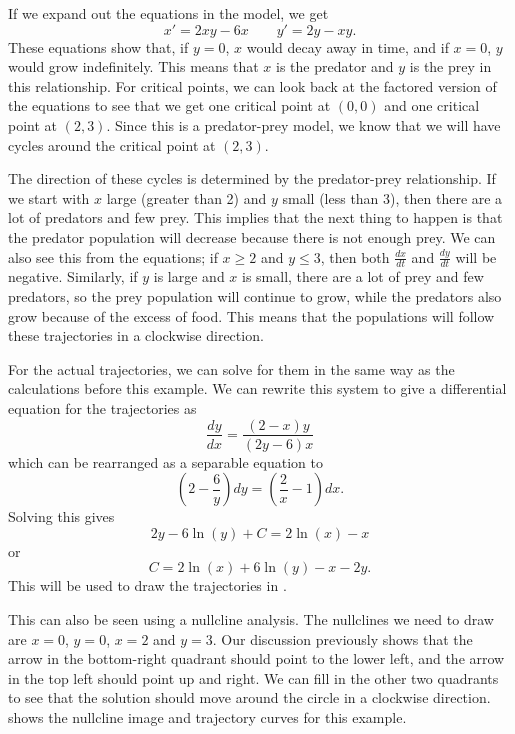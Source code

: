 \documentclass{ximera}
\begin{document}
\begin{exampleSol}
    If we expand out the equations in the model, we get
    \begin{equation*}
        x' = 2xy - 6x \qquad y' = 2y - xy.
    \end{equation*}
    These equations show that, if $y=0$, $x$ would decay away in time, and if $x=0$, $y$ would grow indefinitely. This means that $x$ is the predator and $y$ is the prey in this relationship. For critical points, we can look back at the factored version of the equations to see that we get one critical point at $(0,0)$ and one critical point at $(2, 3)$. Since this is a predator-prey model, we know that we will have cycles around the critical point at $(2,3)$. 
    
    The direction of these cycles is determined by the predator-prey relationship. If we start with $x$ large (greater than 2) and $y$ small (less than 3), then there are a lot of predators and few prey. This implies that the next thing to happen is that the predator population will decrease because there is not enough prey. We can also see this from the equations; if $x \geq 2$ and $y \leq 3$, then both $\frac{dx}{dt}$ and $\frac{dy}{dt}$ will be negative. Similarly, if $y$ is large and $x$ is small, there are a lot of prey and few predators, so the prey population will continue to grow, while the predators also grow because of the excess of food. This means that the populations will follow these trajectories in a clockwise direction. 
    
    For the actual trajectories, we can solve for them in the same way as the calculations before this example. We can rewrite this system to give a differential equation for the trajectories as 
    \begin{equation*}
        \frac{dy}{dx} = \frac{(2-x)y}{(2y-6)x}
    \end{equation*}
    which can be rearranged as a separable equation to
    \begin{equation*}
        \left(2 - \frac{6}{y}\right) dy = \left(\frac{2}{x} - 1\right) dx.
    \end{equation*}
    Solving this gives
    \begin{equation*}
        2y - 6\ln(y) + C = 2\ln(x) - x
    \end{equation*}
    or
    \begin{equation*}
        C = 2\ln(x) + 6\ln(y) - x - 2y.
    \end{equation*}
    This will be used to draw the trajectories in .
    
    This can also be seen using a nullcline analysis. The nullclines we need to draw are $x=0$, $y=0$, $x=2$ and $y=3$. Our discussion previously shows that the arrow in the bottom-right quadrant should point to the lower left, and the arrow in the top left should point up and right. We can fill in the other two quadrants to see that the solution should move around the circle in a clockwise direction.  shows the nullcline image and trajectory curves for this example.
\end{exampleSol}
\end{document}
